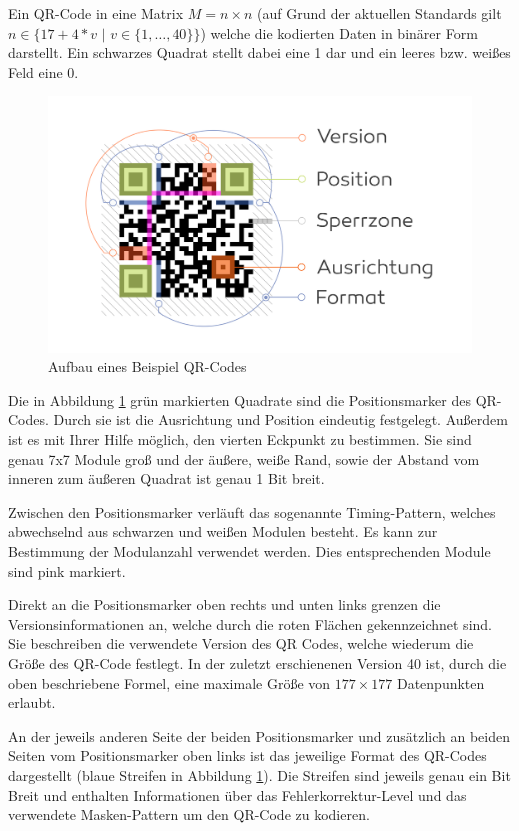 \documentclass[a4paper, oneside, 12pt]{article}
\begin{document}
Ein QR-Code in eine Matrix $M = n \times n$ \Big(auf Grund der aktuellen Standards \cite{wikipedia} gilt $n \in \big\{17+4*v \,\, | \,\, v \in  \{1,\dots, 40\}\big\}$\Big) welche die kodierten Daten in binärer Form darstellt. Ein schwarzes Quadrat stellt dabei eine 1 dar und ein leeres bzw. weißes Feld eine 0.

\begin{figure}[h]
	\includegraphics[width=\textwidth]{images/aufbau.png}
	\caption{Aufbau eines Beispiel QR-Codes}
	\label{fig:aufbau}
\end{figure}

Die in Abbildung \ref{fig:aufbau} grün markierten Quadrate sind die Positionsmarker des QR-Codes. Durch sie ist die Ausrichtung und Position eindeutig festgelegt. Außerdem ist es mit Ihrer Hilfe möglich, den vierten Eckpunkt zu bestimmen. Sie sind genau 7x7 Module groß und der äußere, weiße Rand, sowie der Abstand vom inneren zum äußeren Quadrat ist genau 1 Bit breit.

Zwischen den Positionsmarker verläuft das sogenannte Timing-Pattern, welches abwechselnd aus schwarzen und weißen Modulen besteht. Es kann zur Bestimmung der Modulanzahl verwendet werden. Dies entsprechenden Module sind pink markiert.

Direkt an die Positionsmarker oben rechts und unten links grenzen die Versionsinformationen an,  welche durch die roten Flächen gekennzeichnet sind. Sie beschreiben die verwendete Version des QR Codes, welche wiederum die Größe des QR-Code festlegt. In der zuletzt erschienenen Version 40 ist, durch die oben beschriebene Formel, eine maximale Größe von $177 \times 177$ Datenpunkten erlaubt.

An der jeweils anderen Seite der beiden Positionsmarker und zusätzlich an beiden Seiten vom Positionsmarker oben links ist das jeweilige Format des QR-Codes dargestellt (blaue Streifen in Abbildung \ref{fig:aufbau}). Die Streifen sind jeweils genau ein Bit Breit und enthalten Informationen über das Fehlerkorrektur-Level und das verwendete Masken-Pattern um den QR-Code zu kodieren.%
\end{document}
